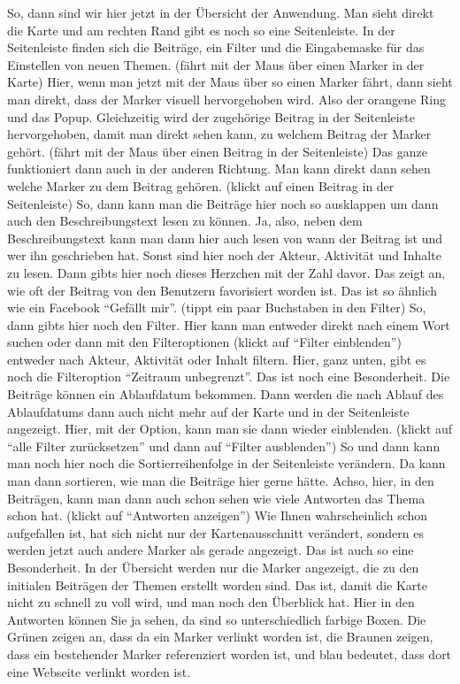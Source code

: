 So, dann sind wir hier jetzt in der {\"U}bersicht der Anwendung. Man sieht direkt die Karte und am rechten Rand gibt es noch so eine Seitenleiste. In der Seitenleiste finden sich die Beitr{\"a}ge, ein Filter und die Eingabemaske f{\"u}r das Einstellen von neuen Themen. (f{\"a}hrt mit der Maus {\"u}ber einen Marker in der Karte) Hier, wenn man jetzt mit der Maus {\"u}ber so einen Marker f{\"a}hrt, dann sieht man direkt, dass der Marker visuell hervorgehoben wird. Also der orangene Ring und das Popup. Gleichzeitig wird der zugeh{\"o}rige Beitrag in der Seitenleiste hervorgehoben, damit man direkt sehen kann, zu welchem Beitrag der Marker geh{\"o}rt. (f{\"a}hrt mit der Maus {\"u}ber einen Beitrag in der Seitenleiste) Das ganze funktioniert dann auch in der anderen Richtung. Man kann direkt dann sehen welche Marker zu dem Beitrag geh{\"o}ren. (klickt auf einen Beitrag in der Seitenleiste) So, dann kann man die Beitr{\"a}ge hier noch so ausklappen um dann auch den Beschreibungstext lesen zu k{\"o}nnen. Ja, also, neben dem Beschreibungstext kann man dann hier auch lesen von wann der Beitrag ist und wer ihn geschrieben hat. Sonst sind hier noch der Akteur, Aktivit{\"a}t und Inhalte zu lesen. Dann gibts hier noch dieses Herzchen mit der Zahl davor. Das zeigt an, wie oft der Beitrag von den Benutzern favorisiert worden ist. Das ist so {\"a}hnlich wie ein Facebook "`Gef{\"a}llt mir"'. (tippt ein paar Buchstaben in den Filter) So, dann gibts hier noch den Filter. Hier kann man entweder direkt nach einem Wort suchen oder dann mit den Filteroptionen (klickt auf "`Filter einblenden"') entweder nach Akteur, Aktivit{\"a}t oder Inhalt filtern. Hier, ganz unten, gibt es noch die Filteroption "`Zeitraum unbegrenzt"'. Das ist noch eine Besonderheit. Die Beitr{\"a}ge k{\"o}nnen ein Ablaufdatum bekommen. Dann werden die nach Ablauf des Ablaufdatums dann auch nicht mehr auf der Karte und in der Seitenleiste angezeigt. Hier, mit der Option, kann man sie dann wieder einblenden. (klickt auf "`alle Filter zur{\"u}cksetzen"' und dann auf "`Filter ausblenden"') So und dann kann man noch hier noch die Sortierreihenfolge in der Seitenleiste ver{\"a}ndern. Da kann man dann sortieren, wie man die Beitr{\"a}ge hier gerne h{\"a}tte. Achso, hier, in den Beitr{\"a}gen, kann man dann auch schon sehen wie viele Antworten das Thema schon hat. (klickt auf "`Antworten anzeigen"') Wie Ihnen wahrscheinlich schon aufgefallen ist, hat sich nicht nur der Kartenausschnitt ver{\"a}ndert, sondern es werden jetzt auch andere Marker als gerade angezeigt. Das ist auch so eine Besonderheit. In der {\"U}bersicht werden nur die Marker angezeigt, die zu den initialen Beitr{\"a}gen der Themen erstellt worden sind. Das ist, damit die Karte nicht zu schnell zu voll wird, und man noch den {\"U}berblick hat. Hier in den Antworten k{\"o}nnen Sie ja sehen, da sind so unterschiedlich farbige Boxen. Die Gr{\"u}nen zeigen an, dass da ein Marker verlinkt worden ist, die Braunen zeigen, dass ein bestehender Marker referenziert worden ist, und blau bedeutet, dass dort eine Webseite verlinkt worden ist.\\
